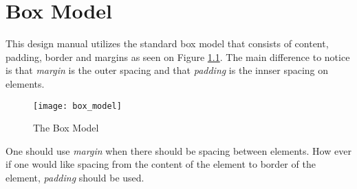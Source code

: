 \chapter{Box Model}
\label{cha:box_model}

This design manual utilizes the standard box model that consists of content, padding, border and margins as seen on Figure \ref{fig:box_model}. The main difference to notice is that \emph{margin} is the outer spacing and that \emph{padding} is the innser spacing on elements. 

\begin{figure}[h]
	\centering
	\texttt{[image: box\_model]}
	\caption{The Box Model}
	\label{fig:box_model}
\end{figure}

One should use \emph{margin} when there should be spacing between elements. How ever if one would like spacing from the content of the element to border of the element, \emph{padding} should be used.

